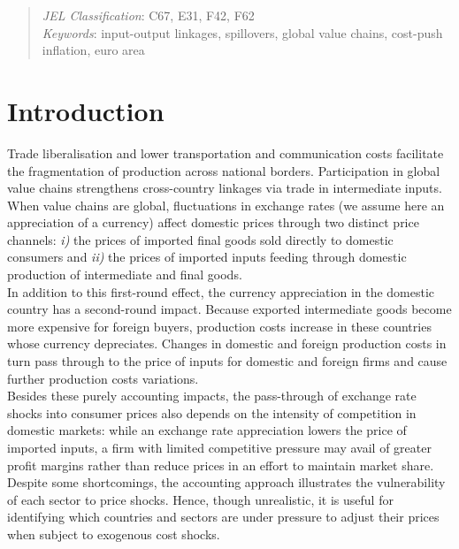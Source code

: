 \documentclass[11pt,a4paper]{article}
\begin{document}
\begin{abstract}
{\small \bigskip \noindent \emph{JEL Classification}\/: C67, E31, F42, F62\\}
{\small \noindent \emph{Keywords}\/: input-output linkages, spillovers, global value chains, cost-push inflation, euro area \\ }
\end{abstract}

\section{Introduction}




Trade liberalisation and lower transportation and communication costs facilitate the fragmentation of production across national borders.
Participation in global value chains strengthens cross-country linkages via trade in intermediate inputs.
When value chains are global, fluctuations in exchange rates (we assume here an appreciation of a currency) aﬀect domestic prices through two distinct price channels: \textit{i)} the prices of imported ﬁnal goods sold directly to domestic consumers and \textit{ii)} the prices of imported inputs feeding through domestic production of intermediate and ﬁnal goods.\\
In addition to this first-round effect, the currency appreciation in the domestic country has a second-round impact. Because exported intermediate goods become more expensive for foreign buyers, production costs increase in these countries whose currency depreciates.
Changes in domestic and foreign production costs in turn pass through to the price of inputs for domestic and foreign firms and cause further production costs variations.\\
Besides these purely accounting impacts, the pass-through of exchange rate shocks into consumer prices also depends on the intensity of competition in domestic markets: while an exchange rate appreciation lowers the price of imported inputs, a ﬁrm with limited competitive pressure may avail of greater proﬁt margins rather than reduce prices in an eﬀort to maintain market share.\\
Despite some shortcomings, the accounting approach illustrates the vulnerability of each sector to price shocks. 
Hence, though unrealistic, it is useful for identifying which countries and sectors are under pressure to adjust their prices when subject to exogenous cost shocks.
\end{document}
